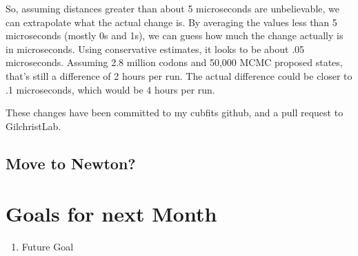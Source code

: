 So, assuming distances greater than about 5 microseconds are unbelievable, we can extrapolate what the actual change is. By averaging the values less than 5 microseconds (mostly 0s and 1s), we can guess how much the change actually is in microseconds. Using conservative estimates, it looks to be about .05 microseconds. Assuming 2.8 million codons and 50,000 MCMC proposed states, that's still a difference of 2 hours per run. The actual difference could be closer to .1 microseconds, which would be 4 hours per run.

These changes have been committed to my cubfits github, and a pull request to GilchristLab.


\subsection{Move to Newton?}


\section{Goals for next Month}
\begin{enumerate}
\item Future Goal
\end{enumerate}


